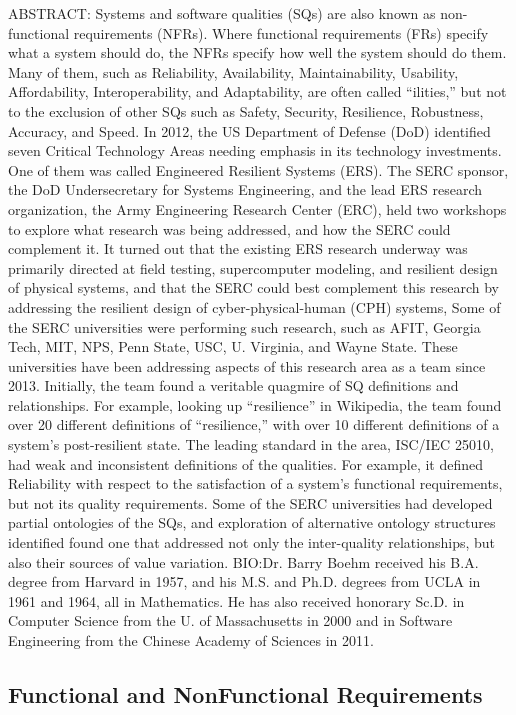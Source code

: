ABSTRACT: Systems and software qualities (SQs) are also known as non-functional requirements (NFRs). Where functional requirements (FRs) specify what a system should do, the NFRs specify how well the system should do them. Many of them, such as Reliability, Availability, Maintainability, Usability, Affordability, Interoperability, and Adaptability, are often called “ilities,” but not to the exclusion of other SQs such as Safety, Security, Resilience, Robustness, Accuracy, and Speed.
In 2012, the US Department of Defense (DoD) identified seven Critical Technology Areas needing emphasis in its technology investments. One of them was called Engineered Resilient Systems (ERS). The SERC sponsor, the DoD Undersecretary for Systems Engineering, and the lead ERS research organization, the Army Engineering Research Center (ERC), held two workshops to explore what research was being addressed, and how the SERC could complement it. It turned out that the existing ERS research underway was primarily directed at field testing, supercomputer modeling, and resilient design of physical systems, and that the SERC could best complement this research by addressing the resilient design of cyber-physical-human (CPH) systems, Some of the SERC universities were performing such research, such as AFIT, Georgia Tech, MIT, NPS, Penn State, USC, U. Virginia, and Wayne State. These universities have been addressing aspects of this research area as a team since 2013.
Initially, the team found a veritable quagmire of SQ definitions and relationships. For example, looking up “resilience” in Wikipedia, the team found over 20 different definitions of “resilience,” with over 10 different definitions of a system’s post-resilient state. The leading standard in the area, ISC/IEC 25010, had weak and inconsistent definitions of the qualities. For example, it defined Reliability with respect to the satisfaction of a system’s functional requirements, but not its quality requirements. Some of the SERC universities had developed partial ontologies of the SQs, and exploration of alternative ontology structures identified found one that addressed not only the inter-quality relationships, but also their sources of value variation.
BIO:Dr. Barry Boehm received his B.A. degree from Harvard in 1957, and his M.S. and Ph.D. degrees from UCLA in 1961 and 1964, all in Mathematics. He has also received honorary Sc.D. in Computer Science from the U. of Massachusetts in 2000 and in Software Engineering from the Chinese Academy of Sciences in 2011.

\subsection{Functional and Non\-Functional Requirements}

